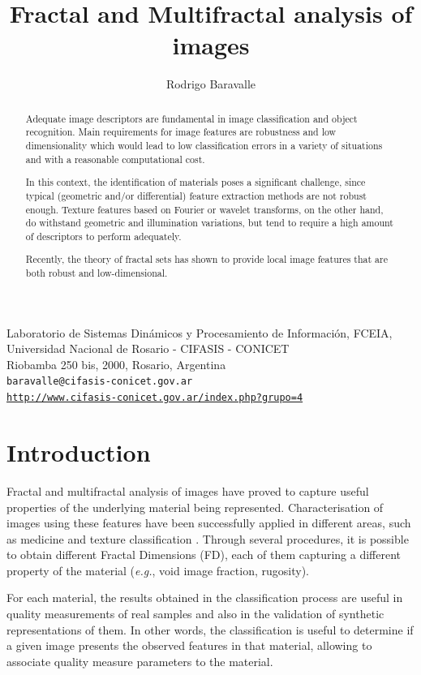 \documentclass[oneside,a4paper,english,links]{article}
\title{Fractal and Multifractal analysis of images}
\author{Rodrigo Baravalle}
\begin{document}
\maketitle
\begin{center}
\small{Laboratorio de Sistemas Din\'amicos y Procesamiento de Informaci\'on, FCEIA, Universidad Nacional de Rosario - CIFASIS - CONICET}\\
\small{Riobamba 250 bis, 2000, Rosario, Argentina}\\

\texttt{baravalle@cifasis-conicet.gov.ar}\\
\texttt{\url{http://www.cifasis-conicet.gov.ar/index.php?grupo=4}}
\end{center}

\begin{abstract}
Adequate image descriptors are fundamental in image classification and object recognition. Main requirements for image features are robustness and low dimensionality which would lead to low classification errors in a variety of situations and with a reasonable computational cost.

In this context, the identification of materials poses a significant challenge, since typical (geometric and/or differential) feature extraction methods are not robust enough. Texture features based on Fourier or wavelet transforms, on the other hand, do withstand geometric and illumination variations, but tend to require a high amount of descriptors to perform adequately. 

Recently, the theory of fractal sets has shown to provide local image features that are both robust and low-dimensional.
\end{abstract}

\section{Introduction}
Fractal and multifractal analysis of images have proved to capture useful properties of the underlying material being represented. Characterisation of images using these features have been successfully applied in different areas, such as medicine \cite{Andjelkovic2008,Yu2011} and texture classification \cite{Wendt2009}. Through several procedures, it is possible to obtain different Fractal Dimensions (FD), each of them capturing a different property of the material ({\em e.g.}, void image fraction, rugosity).

For each material, the results obtained in the classification process are useful in quality measurements of real samples and also in the validation of synthetic representations of them. In other words, the classification is useful to determine if a given image presents the observed features in that material, allowing to associate quality measure parameters to the material.
\end{document}
